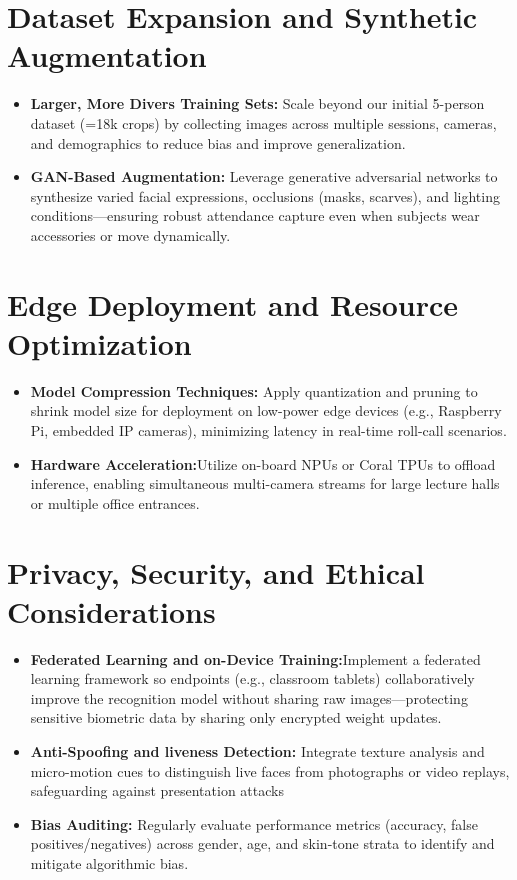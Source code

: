 \documentclass[openany]{report}
\begin{document}
\section{Dataset Expansion and Synthetic Augmentation}
\begin{itemize}
    \item \textbf{Larger, More Divers Training Sets:} Scale beyond our initial 5-person dataset (=18k crops) by collecting images across multiple sessions, cameras, and demographics to reduce bias and improve generalization.
    \item \textbf{GAN-Based Augmentation:} Leverage generative adversarial networks to synthesize varied facial expressions, occlusions (masks, scarves), and lighting conditions—ensuring robust attendance capture even when subjects wear accessories or move dynamically.
\end{itemize}

\section{Edge Deployment and Resource Optimization}
\begin{itemize}
    \item \textbf{Model Compression Techniques:} Apply quantization and pruning to shrink model size for deployment on low-power edge devices (e.g., Raspberry Pi, embedded IP cameras), minimizing latency in real-time roll-call scenarios.
    \item \textbf{Hardware Acceleration:}Utilize on-board NPUs or Coral TPUs to offload inference, enabling simultaneous multi-camera streams for large lecture halls or multiple office entrances.
\end{itemize}
\section{Privacy, Security, and Ethical Considerations}
\begin{itemize}
    \item \textbf{Federated Learning and on-Device Training:}Implement a federated learning framework so endpoints (e.g., classroom tablets) collaboratively improve the recognition model without sharing raw images—protecting sensitive biometric data by sharing only encrypted weight updates.
    \item \textbf{Anti-Spoofing and liveness Detection:} Integrate texture analysis and micro-motion cues to distinguish live faces from photographs or video replays, safeguarding against presentation attacks
    \item \textbf{Bias Auditing:} Regularly evaluate performance metrics (accuracy, false positives/negatives) across gender, age, and skin-tone strata to identify and mitigate algorithmic bias.
\end{itemize}
\end{document}
